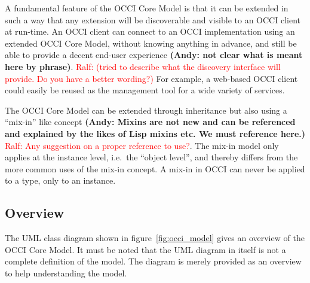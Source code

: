 \documentclass[10pt,a4paper]{article}
\newcommand{\ralf}[1]{\textcolor{red}{Ralf: #1}}
\begin{document}
A fundamental feature of the OCCI Core Model is that it can be extended in such a
way that any extension will be discoverable and visible to an OCCI client at
run-time. An OCCI client can connect to an OCCI implementation using an
extended OCCI Core Model, without knowing anything in advance, and still be
able to provide a decent end-user experience \textbf{(Andy: not clear what is meant here by phrase)}. 
\ralf{(tried to describe what the discovery interface will provide. Do you have a better wording?)}
For example, a web-based OCCI
client could easily be reused as the management tool for a wide variety of
services.

The OCCI Core Model can be extended through inheritance but also
using a ``mix-in'' like concept \textbf{(Andy: Mixins are not new and can be referenced and explained
by the likes of Lisp mixins etc. We must reference here.)}
\ralf{Any suggestion on a proper reference to use?}.
The mix-in model only applies at the instance
level, i.e.~the ``object level'', and thereby differs from the more common uses
of the mix-in concept. A mix-in in OCCI can never be applied to a type, only to
an instance.

\subsection{Overview}

The UML class diagram shown in figure~\ref{fig:occi_model} gives an overview of
the OCCI Core Model. It must be noted that the UML diagram in itself is not a
complete definition of the model. The diagram is merely provided as an overview
to help understanding the model. 
\end{document}

